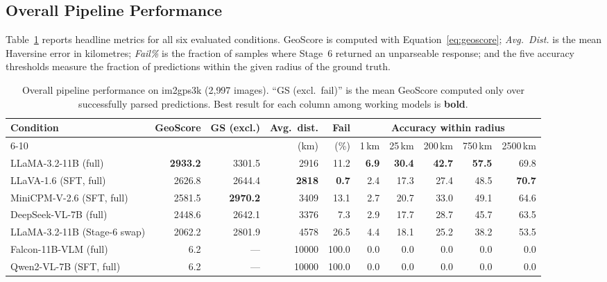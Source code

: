 \documentclass[11pt]{article}
\begin{document}
\subsection{Overall Pipeline Performance}

Table~\ref{tab:overall} reports headline metrics for all six evaluated conditions.
GeoScore is computed with Equation~\eqref{eq:geoscore}; \emph{Avg.\ Dist.} is the
mean Haversine error in kilometres; \emph{Fail\%} is the fraction of samples where
Stage~6 returned an unparseable response; and the five accuracy thresholds measure the
fraction of predictions within the given radius of the ground truth.

\begin{table}[ht]
\centering
\caption{Overall pipeline performance on im2gps3k (2{,}997 images). ``GS (excl.\ fail)''
         is the mean GeoScore computed only over successfully parsed predictions.
         Best result for each column among working models is \textbf{bold}.}
\label{tab:overall}
\setlength{\tabcolsep}{5pt}
\begin{tabular}{lrrrrrrrrr}
\toprule
\multirow{2}{*}{\textbf{Condition}} &
  \multirow{2}{*}{\textbf{GeoScore}} &
  \multirow{2}{*}{\textbf{GS (excl.)}} &
  \multirow{2}{*}{\textbf{Avg.\ dist.}} &
  \textbf{Fail} &
  \multicolumn{5}{c}{\textbf{Accuracy within radius}} \\
\cmidrule(lr){6-10}
 & & & (km) & (\%) & 1\,km & 25\,km & 200\,km & 750\,km & 2500\,km \\
\midrule
LLaMA-3.2-11B (full)          & \textbf{2933.2} & 3301.5 & 2916 & 11.2 & \textbf{6.9} & \textbf{30.4} & \textbf{42.7} & \textbf{57.5} & 69.8 \\
LLaVA-1.6 (SFT, full)        & 2626.8 & 2644.4 & \textbf{2818} & \textbf{0.7} & 2.4 & 17.3 & 27.4 & 48.5 & \textbf{70.7} \\
MiniCPM-V-2.6 (SFT, full)    & 2581.5 & \textbf{2970.2} & 3409 & 13.1 & 2.7 & 20.7 & 33.0 & 49.1 & 64.6 \\
DeepSeek-VL-7B (full)         & 2448.6 & 2642.1 & 3376 & 7.3 & 2.9 & 17.7 & 28.7 & 45.7 & 63.5 \\
LLaMA-3.2-11B (Stage-6 swap)  & 2062.2 & 2801.9 & 4578 & 26.5 & 4.4 & 18.1 & 25.2 & 38.2 & 53.5 \\
Falcon-11B-VLM (full)         & 6.2    & ---    & 10000& 100.0& 0.0 & 0.0 & 0.0 & 0.0 & 0.0 \\
Qwen2-VL-7B (SFT, full)       & 6.2    & ---    & 10000& 100.0& 0.0 & 0.0 & 0.0 & 0.0 & 0.0 \\
\bottomrule
\end{tabular}
\end{table}
\end{document}
